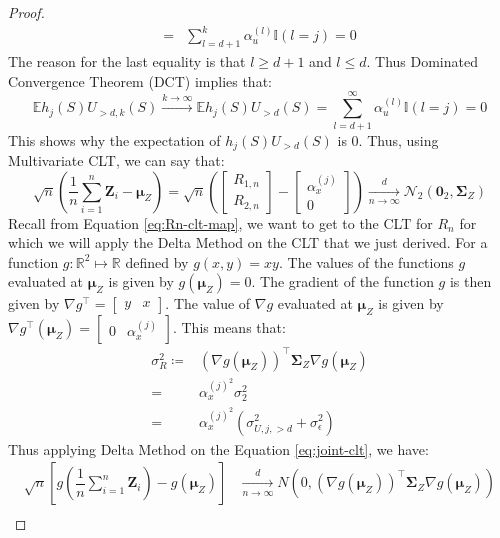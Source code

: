 \documentclass[
  12pt]{article}
\newcommand{\klim}{\xrightarrow[]{k \to \infty}}
\newcommand{\dnlim}{\xrightarrow[n \to \infty]{d}}
\newcommand{\bmu}{\boldsymbol{\mu}}
\newcommand{\R}{\mathbb{R}}
\newcommand{\bZ}{\boldsymbol{Z}}
\newcommand{\bSig}{\boldsymbol{\Sigma}}
\newcommand{\E}{\mathbb{E}}
\newcommand{\bzero}{\boldsymbol{0}}
\begin{document}
\begin{proof}
$$\begin{aligned}
= & \sum_{l=d+1}^k\alpha_u^{(l)}\mathbb{I}(l=j)=0
\end{aligned}
$$
The reason for the last equality is that $l \geq d+1$ and $l \leq d$. Thus Dominated Convergence Theorem (DCT) implies that:
$$
\E h_j(S)U_{>d,k}(S) \klim \E h_j(S)U_{>d}(S) = \sum_{l=d+1}^\infty\alpha_u^{(l)}\mathbb{I}(l=j) = 0
$$
This shows why the expectation of $h_j(S)U_{>d}(S)$ is 0. Thus, using Multivariate CLT, we can say that:
\begin{equation}\label{eq:joint-clt}
    \sqrt{n}\left(\dfrac{1}{n}\sum_{i=1}^n \bZ_i - \bmu_Z\right) = \sqrt{n}\left(\begin{bmatrix}
     R_{1,n}\\
     R_{2,n}
 \end{bmatrix} - \begin{bmatrix}
     \alpha_x^{(j)}\\
     0
 \end{bmatrix}\right) \dnlim \mathcal{N}_{2}\left(\bzero_{2},\bSig_Z\right)
\end{equation}
Recall from Equation \ref{eq:Rn-clt-map}, we want to get to the CLT for $R_n$ for which we will apply the Delta Method on the CLT that we just derived. For a function $g: \R^{2} \mapsto \R$ defined by $g(x,y) = xy$. The values of the functions $g$  evaluated at $\bmu_Z$ is given by $g(\bmu_Z) = 0$.
The gradient of the function $g$ is then given by $\nabla g^\top = \begin{bmatrix}
    y & x
\end{bmatrix}$. The value of $\nabla g$ evaluated at $\bmu_Z$ is given by 
        $\nabla g^\top(\bmu_Z) = \begin{bmatrix}
    0 & \alpha_x^{(j)} 
\end{bmatrix}$.
This means that:
\begin{equation}\label{eq:lim-var}
    \begin{split}
        \sigma^2_R \coloneqq & (\nabla g(\bmu_Z))^\top\bSig_Z \nabla g(\bmu_Z) \\
        =& \alpha_x^{(j)^2} \sigma^2_2\\
        = & \alpha_x^{(j)^2}(\sigma^2_{U,j,>d} + \sigma^2_\epsilon)
    \end{split}
\end{equation}
Thus applying Delta Method on the Equation \ref{eq:joint-clt}, we have:
\begin{equation}\label{eq:Rn-clt}
\begin{split}
    \sqrt{n}\left[g\left(\dfrac{1}{n}\sum_{i=1}^n \bZ_i\right) - g\left(\bmu_Z\right)\right]& \dnlim N\left(0, (\nabla g(\bmu_Z))^\top \bSig_Z \nabla g(\bmu_Z)\right)\\

\end{split}
\end{equation}
\end{proof}
\end{document}
